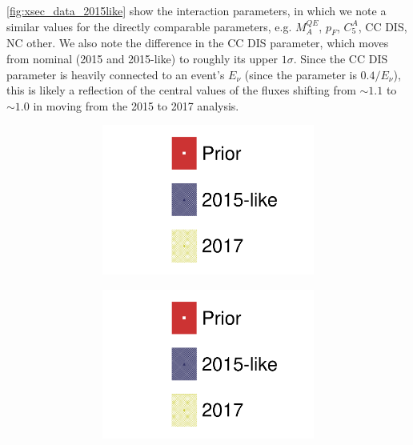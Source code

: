 \autoref{fig:xsec_data_2015like} show the interaction parameters, in which we note a similar values for the directly comparable parameters, e.g. $M_A^{QE}$, $p_F$, $C_5^A$, CC DIS, NC other.  We also note the difference in the CC DIS parameter, which moves from nominal (2015 and 2015-like) to roughly its upper $1\sigma$. Since the CC DIS parameter is heavily connected to an event's $E_\nu$ (since the parameter is $0.4/E_\nu$), this is likely a reflection of the central values of the fluxes shifting from $\sim1.1$ to $\sim1.0$ in moving from the 2015 to 2017 analysis.
\begin{figure}[h]
	\begin{subfigure}[t]{\textwidth}
		\begin{subfigure}[t]{0.24\textwidth}
			\includegraphics[width=\textwidth, trim={0mm 0mm 0mm 0mm}, clip,page=18]{figures/mach3/data/alt/2017b_NewData_NewDet_hpc_2015like__2017b_NewData_NewDet_UpdXsecStep_2Xsec_4Det_5Flux_0.pdf}
		\end{subfigure}
		\begin{subfigure}[t]{0.24\textwidth}
			\includegraphics[width=\textwidth, trim={0mm 0mm 0mm 0mm}, clip,page=19]{figures/mach3/data/alt/2017b_NewData_NewDet_hpc_2015like__2017b_NewData_NewDet_UpdXsecStep_2Xsec_4Det_5Flux_0.pdf}

\end{subfigure}
\end{subfigure}
\end{figure}
